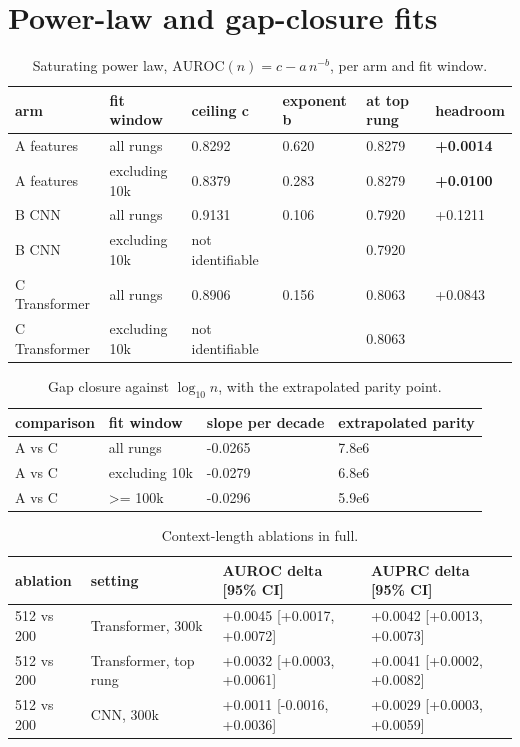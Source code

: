 \documentclass[10pt,twocolumn,letterpaper]{article}
\begin{document}
\section{Power-law and gap-closure fits}



\begin{table}[!ht]
\centering
\small
\caption{Saturating power law, $\mathrm{AUROC}(n) = c - a\,n^{-b}$, per arm and fit window.}
\label{tab:4}
\begin{tabular}{llllll}
\toprule
arm & fit window & ceiling c & exponent b & at top rung & headroom \\
\midrule
A features & all rungs & 0.8292 & 0.620 & 0.8279 & \textbf{+0.0014} \\
A features & excluding 10k & 0.8379 & 0.283 & 0.8279 & \textbf{+0.0100} \\
B CNN & all rungs & 0.9131 & 0.106 & 0.7920 & +0.1211 \\
B CNN & excluding 10k & not identifiable &  & 0.7920 &  \\
C Transformer & all rungs & 0.8906 & 0.156 & 0.8063 & +0.0843 \\
C Transformer & excluding 10k & not identifiable &  & 0.8063 &  \\
\bottomrule
\end{tabular}
\end{table}



\begin{table}[!ht]
\centering
\small
\caption{Gap closure against $\log_{10} n$, with the extrapolated parity point.}
\label{tab:5}
\begin{tabular}{llll}
\toprule
comparison & fit window & slope per decade & extrapolated parity \\
\midrule
A vs C & all rungs & -0.0265 & 7.8e6 \\
A vs C & excluding 10k & -0.0279 & 6.8e6 \\
A vs C & \textgreater{}= 100k & -0.0296 & 5.9e6 \\
\bottomrule
\end{tabular}
\end{table}



\begin{table}[!ht]
\centering
\small
\caption{Context-length ablations in full.}
\label{tab:6}
\begin{tabular}{llll}
\toprule
ablation & setting & AUROC delta [95\% CI] & AUPRC delta [95\% CI] \\
\midrule
512 vs 200 & Transformer, 300k & +0.0045 [+0.0017, +0.0072] & +0.0042 [+0.0013, +0.0073] \\
512 vs 200 & Transformer, top rung & +0.0032 [+0.0003, +0.0061] & +0.0041 [+0.0002, +0.0082] \\
512 vs 200 & CNN, 300k & +0.0011 [-0.0016, +0.0036] & +0.0029 [+0.0003, +0.0059] \\
\bottomrule
\end{tabular}
\end{table}
\end{document}
